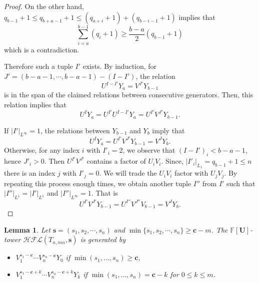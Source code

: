 \documentclass{amsart}
\newtheorem{lemma}[theorem]{Lemma}
\newcommand{\F}{\mathbb{F}}
\newcommand{\cHFL}{\mathcal{H\!F\! L}}
\newcommand{\UU}{\mathbf{U}}
\newcommand{\cc}{\mathbf{c}}
\renewcommand{\ss}{\mathbf{s}}
\begin{document}
\begin{proof}
On the other hand, $q_{b-1}+1\le q_{b+a-1}+1\le (q_{a+i}+1)+(q_{b-i-1}+1)$ implies that 
\[\sum_{i=a}^{b-1}(q_i+1)\ge \frac{b-a}{2}(q_{b-1}+1)\]
which is a contradiction. 









Therefore such a tuple $I'$ exists. By induction, for $J'=(b-a-1, \cdots, b-a-1)-(I-I')$, the relation 
$$U^{I-I'}Y_a=V^{J'} Y_{b-1}$$
is in the span of the claimed relations between consecutive generators. Then, this relation implies that 
$$U^I Y_a=U^{I'} U^{I-I'}Y_a=U^{I'} V^{J'}Y_{b-1}.$$

If $|I'|_{L^\infty}=1$, the relations between $Y_{b-1}$ and $Y_b$ imply that
$$U^I Y_a=U^{I'} V^{J'}Y_{b-1}=V^J Y_{b}.$$
Otherwise, for any  index $i$ with  $I'_i=2$, we observe that $(I-I')_i<b-a-1$, hence $J'_i>0$. Then $U^{I'} V^{J'}$ contains a factor of $U_iV_i$. Since, $|I'_i|_{L_1}=q_{b-1}+1\le n$ there is an index $j$ with $I'_j=0$. We will trade the $U_iV_i$ factor with $U_jV_j$.  By repeating this process enough times, we obtain another tuple $I''$ from $I'$ such that $|I''|_{L^1}=|I'|_{L^1}$ and $|I''|_{L^\infty}=1$. That is
$$U^{I'} V^{J'} Y_{b-1}=U^{I''}V^{J''}V_{b-1}=V^{J} Y_{b}.$$
\end{proof}




\begin{lemma}
\label{lem: stable range} Let $\ss=(s_1,s_2,\cdots,s_{n})$ and $\min\{s_1,s_2,\cdots,s_n\}\ge \cc-m$. The $\F[\UU]$-tower $\cHFL(T_{n,mn},\ss)$ is generated by
\begin{itemize}
\item[(a)]  $V^{s_1-\cc}_1\cdots V^{s_n-\cc}_nY_0$ if $\min(s_1,\ldots,s_n)\ge \cc$,
\item[(b)]  $V^{s_1-\cc+k}_1\cdots V^{s_n-\cc+k}_nY_k$ if $\min(s_1,\ldots,s_n)=\cc-k$ for $0\le k\le m$.
\end{itemize}
\end{lemma}
\end{document}
